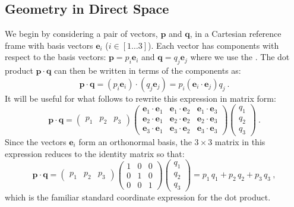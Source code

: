 \subsection{Geometry in Direct Space }\label{\chabbr:ssec:DS}
We begin by considering a pair of vectors, $\mathbf{p}$ and $\mathbf{q}$, in a Cartesian reference frame with basis vectors $\mathbf{e}_i$ ($i\in[1\ldots 3]$). Each vector has components with respect to the basis vectors: $\mathbf{p}=p_i\mathbf{e}_i$ and $\mathbf{q}=q_j\mathbf{e}_j$ where we use the .  The dot product $\mathbf{p}\cdot\mathbf{q}$ can then be written in terms of the components as:
\[
	\mathbf{p}\cdot\mathbf{q} = (p_i\mathbf{e}_i)\cdot (q_j\mathbf{e}_j) = p_i(\mathbf{e}_i\cdot\mathbf{e}_j) q_j\ .
\]
It will be useful for what follows to rewrite this expression in matrix form:
\begin{equation}
\mathbf{p}\cdot\mathbf{q} = \begin{pmatrix}p_1&p_2&p_3\end{pmatrix}\begin{pmatrix}	
	\mathbf{e}_1\cdot\mathbf{e}_1 & \mathbf{e}_1\cdot\mathbf{e}_2 & \mathbf{e}_1\cdot\mathbf{e}_3 \\
	\mathbf{e}_2\cdot\mathbf{e}_1 & \mathbf{e}_2\cdot\mathbf{e}_2 & \mathbf{e}_2\cdot\mathbf{e}_3 \\
	\mathbf{e}_3\cdot\mathbf{e}_1 & \mathbf{e}_3\cdot\mathbf{e}_2 & \mathbf{e}_3\cdot\mathbf{e}_3\end{pmatrix}
	\begin{pmatrix}q_1\\ q_2\\ q_3\end{pmatrix}\ . \label{\chabbr:eq:cartdp}
\end{equation}
Since the vectors $\mathbf{e}_i$ form an orthonormal basis, the $3\times 3$ matrix in this expression reduces to the identity matrix so that:
\[
\mathbf{p}\cdot\mathbf{q} = \begin{pmatrix}p_1&p_2&p_3\end{pmatrix}\begin{pmatrix}	
	1&0&0\\ 0&1&0\\ 0&0&1\end{pmatrix}
	\begin{pmatrix}q_1\\ q_2\\ q_3\end{pmatrix} = p_1\,q_1+p_2\,q_2+p_3\, q_3\ ,
\]
which is the familiar standard coordinate expression for the dot product.  


